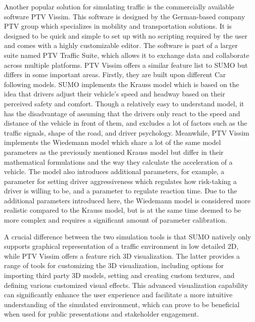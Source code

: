         Another popular solution for simulating traffic is the commercially available software PTV Vissim. This software is designed by the German-based company PTV group which specializes in mobility and transportation solutions. It is designed to be quick and simple to set up with no scripting required by the user and comes with a highly customizable editor. The software is part of a larger suite named PTV Traffic Suite, which allows it to exchange data and collaborate across multiple platforms. PTV Vissim offers a similar feature list to SUMO but differs in some important areas. Firstly, they are built upon different Car following models. SUMO implements the Krauss model which is based on the idea that drivers adjust their vehicle’s speed and headway based on their perceived safety and comfort. Though a relatively easy to understand model, it has the disadvantage of assuming that the drivers only react to the speed and distance of the vehicle in front of them, and excludes a lot of factors such as the traffic signals, shape of the road, and driver psychology. Meanwhile, PTV Vissim implements the Wiedemann model\cite{ahmed2021} which share a lot of the same model parameters as the previously mentioned Krauss model but differ in their mathematical formulations and the way they calculate the acceleration of a vehicle. The model also introduces additional parameters, for example, a parameter for setting driver aggressiveness which regulates how risk-taking a driver is willing to be, and a parameter to regulate reaction time. Due to the additional parameters introduced here, the Wiedemann model is considered more realistic compared to the Krauss model, but is at the same time deemed to be more complex and requires a significant amount of parameter calibration.

        A crucial difference between the two simulation tools is that SUMO natively only supports graphical representation of a traffic environment in low detailed 2D, while PTV Vissim offers a feature rich 3D visualization. The latter provides a range of tools for customizing the 3D visualization, including options for importing third party 3D models, setting and creating custom textures, and defining various customized visual effects. This advanced visualization capability can significantly enhance the user experience and facilitate a more intuitive understanding of the simulated environment, which can prove to be beneficial when used for public presentations and stakeholder engagement. 

